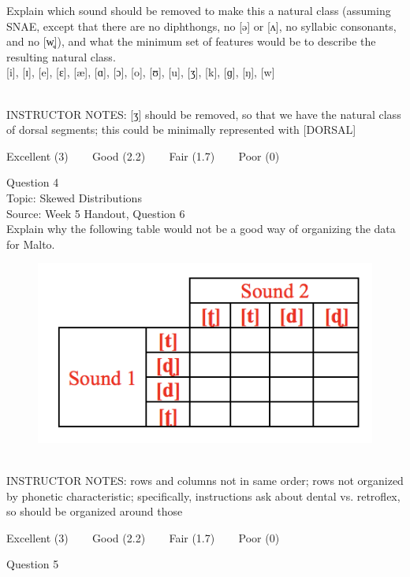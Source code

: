 \documentclass[12pt]{article}
\begin{document}
Explain which sound should be removed to make this a natural class (assuming SNAE, except that there are no diphthongs, no [ə] or [ʌ], no syllabic consonants, and no [w̥]), and what the minimum set of features would be to describe the resulting natural class.\\

{[i]}, {[ɪ]}, {[e]}, {[ɛ]}, {[æ]}, {[ɑ]}, {[ɔ]}, {[o]}, {[ʊ]}, {[u]}, {[ʒ]}, {[k]}, {[ɡ]}, {[ŋ]}, {[w]}


~\\
INSTRUCTOR NOTES: [ʒ] should be removed, so that we have the natural class of dorsal segments; this could be minimally represented with [DORSAL]


\vfill
Excellent (3) ~~~ Good (2.2) ~~~ Fair (1.7) ~~~ Poor (0)
\newpage

{\large Question 4}\\

Topic: Skewed Distributions\\
Source: Week 5 Handout, Question 6\\

Explain why the following table would not be a good way of organizing the data for Malto.\\

\begin{figure}[H]
\includegraphics{../images/Malto_table_bad.png}
\end{figure}

~\\
INSTRUCTOR NOTES: rows and columns not in same order; rows not organized by phonetic characteristic; specifically, instructions ask about dental vs. retroflex, so should be organized around those


\vfill
Excellent (3) ~~~ Good (2.2) ~~~ Fair (1.7) ~~~ Poor (0)
\newpage

{\large Question 5}\\
\end{document}
